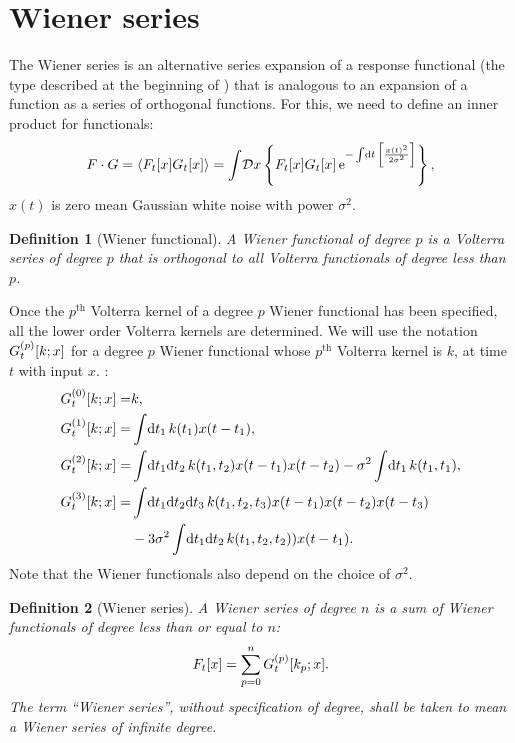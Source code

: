 \documentclass[12pt]{article}
\theoremstyle{slplain}
\theoremstyle{sldefinition}
\newtheorem{defn}{Definition}
\theoremstyle{remark}
\begin{document}
\section{Wiener series}\label{sec:wiener}

The Wiener series is an alternative series expansion of a response functional (the type described at the beginning of ) that is analogous to an expansion of a function as a series of orthogonal functions. For this, we need to define an inner product for functionals:
%
\begin{equation}\label{eq:innerfunc}
  F \cdot G = \left\langle F_t[x]G_t[x] \right\rangle = \int\!\mathcal{D} x \left\{ F_t[x]G_t[x]\,\mathrm{e}^{-\int\!\mathrm{d} t\,\left [ \frac{x(t)^2}{2\sigma^2} \right ]} \right\},
\end{equation}
%
\ie $x(t)$ is zero mean Gaussian white noise with power $\sigma^2$.

\begin{defn}[Wiener functional]
  A Wiener functional of degree $p$ is a Volterra series of degree $p$ that is orthogonal to all Volterra functionals of degree less than $p$.
\end{defn}

Once the $p^{\text{th}}$ Volterra kernel of a degree $p$ Wiener functional has been specified, all the lower order Volterra kernels are determined. We will use the notation $G^{(p)}_t[k;x]$ for a degree $p$ Wiener functional whose $p^{\text{th}}$ Volterra kernel is $k$, at time $t$ with input $x$. \eg \cite[ch.12]{schetzen:1980}:
%
\begin{equation}\label{eq:wienerex}
  \begin{aligned}
    G^{(0)}_t[k;x] =& k, \\
    G^{(1)}_t[k;x] =& \int\!\mathrm{d} t_1\,k(t_1)x(t-t_1), \\
    G^{(2)}_t[k;x] =& \int\!\mathrm{d} t_1\mathrm{d} t_2\,k(t_1,t_2)x(t-t_1)x(t-t_2)
                     -\sigma^2\int\!\mathrm{d} t_1\,k(t_1,t_1), \\
    G^{(3)}_t[k;x] =& \int\!\mathrm{d} t_1\mathrm{d} t_2\mathrm{d} t_3\,k(t_1,t_2,t_3)x(t-t_1)x(t-t_2)x(t-t_3)\\
                     &-3\sigma^2\int\!\mathrm{d} t_1\mathrm{d} t_2\,k(t_1,t_2,t_2))x(t-t_1). 
  \end{aligned}
\end{equation}
%
Note that the Wiener functionals also depend on the choice of $\sigma^2$.

\begin{defn}[Wiener series]
  A Wiener series of degree $n$ is a sum of Wiener functionals of degree less than or equal to $n$:
  \begin{equation}\label{eq:wienerser}
    F_t[x] = \sum_{p=0}^n G^{(p)}_t[k_p;x].
  \end{equation}
  The term ``Wiener series'', without specification of degree, shall be taken to mean a Wiener series of infinite degree.
\end{defn}
\end{document}
